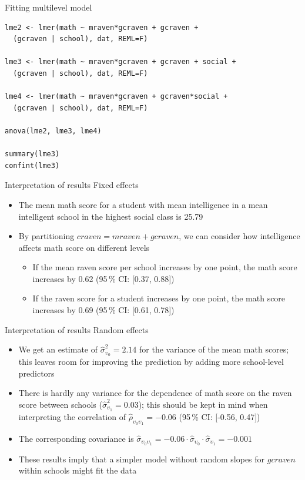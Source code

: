 \documentclass{beamer}
\begin{document}
{

\begin{frame}[fragile]{Fitting multilevel model}
  \begin{lstlisting}
lme2 <- lmer(math ~ mraven*gcraven + gcraven + 
  (gcraven | school), dat, REML=F)

lme3 <- lmer(math ~ mraven*gcraven + gcraven + social +
  (gcraven | school), dat, REML=F)

lme4 <- lmer(math ~ mraven*gcraven + gcraven*social + 
  (gcraven | school), dat, REML=F)

anova(lme2, lme3, lme4)

summary(lme3)
confint(lme3)
  \end{lstlisting}
\end{frame}

}

\begin{frame}{Interpretation of results}
Fixed effects
  \begin{itemize}
    \item The mean math score for a student with mean intelligence in a
          mean intelligent school in the highest social class is 25.79
    \item By partitioning $craven = mraven + gcraven$, we can consider how
      intelligence affects math score on different levels
      \begin{itemize}
        \item If the mean raven score per school increases by one point,
          the math score increases by 0.62 (95\,\% CI: [0.37, 0.88])
        \item If the raven score for a student increases by one point, the
          math score increases by 0.69 (95\,\% CI: [0.61, 0.78])
      \end{itemize}
  \end{itemize}
\end{frame}

\begin{frame}{Interpretation of results}
Random effects
  \begin{itemize}
    \item We get an estimate of $\hat \sigma^2_{\upsilon_{0}} = 2.14$ for
      the variance of the mean math scores; this leaves room for improving
      the prediction by adding more school-level predictors
    \item There is hardly any variance for the dependence of math score on
      the raven score between schools ($\hat \sigma^2_{\upsilon_{1}} =
      0.03$); this should be kept in mind when interpreting the correlation
      of $\hat \rho_{\upsilon_{0}\upsilon_1} = -0.06$ (95\,\% CI: [-0.56,
      0.47])
    \item The corresponding covariance is $\hat
      \sigma_{\upsilon_{0}\upsilon_1} = -0.06 \cdot \hat
      \sigma_{\upsilon_{0}} \cdot \hat \sigma_{\upsilon_{1}} = -0.001$
    \item These results imply that a simpler model without random slopes for
      $gcraven$ within schools might fit the data
  \end{itemize}
\end{frame}
\end{document}
